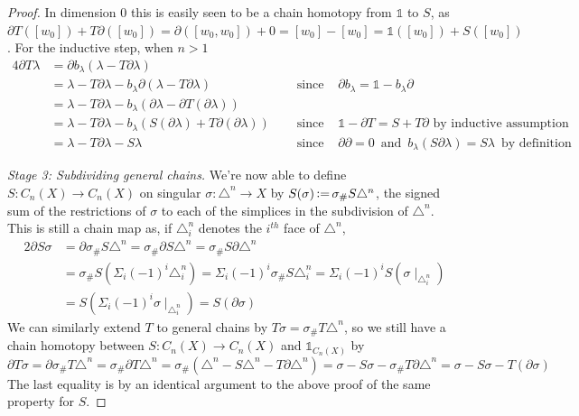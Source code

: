 \documentclass[11pt,a4paper,twoside]{article}
\theoremstyle{plain}
\theoremstyle{definition}
\theoremstyle{definition}
\theoremstyle{definition}
\theoremstyle{definition}
\theoremstyle{definition}
\DeclareMathOperator{\coloneqq}{\vcentcolon=}
\begin{document}
\begin{proof}
In dimension $0$ this is easily seen to be a chain homotopy from $\mathbb{1}$ to $S$, as $\partial T([w_0])+T\partial([w_0])=\partial([w_0,w_0])+0=[w_0]-[w_0]=\mathbb{1}([w_0])+S([w_0])$. For the inductive step, when $n>1$
\begin{alignat*}{4}
\partial T\lambda & = \partial b_\lambda(\lambda-T\partial\lambda)\\
&=\lambda-T\partial\lambda-b_\lambda\partial(\lambda-T\partial\lambda) \quad & \text{ since } & \partial b_\lambda=\mathbb{1}-b_\lambda\partial \\
&=\lambda-T\partial\lambda-b_\lambda(\partial\lambda-\partial T(\partial\lambda))\\
&=\lambda-T\partial\lambda-b_\lambda(S(\partial\lambda)+T\partial(\partial\lambda))\quad & \text{ since } & \mathbb{1}-\partial T=S+T\partial \text{ by inductive assumption }\\
&=\lambda-T\partial\lambda-S\lambda\quad & \text{ since } & \partial\partial=0\,\text{ and } \,b_\lambda(S\partial\lambda)=S\lambda\,\text{ by definition }
\end{alignat*}

\emph{Stage 3: Subdividing general chains.}
We're now able to define $S\!:\!C_n(X)\!\longrightarrow\!C_n(X)$ on singular $\sigma\!:\!\triangle^n\!\longrightarrow X$ by $S(\sigma)\coloneqq\sigma_\#S\triangle^n$, the signed sum of the restrictions of $\sigma$ to each of the simplices in the subdivision of $\triangle^n$. This is still a chain map as, if $\triangle_i^n$ denotes the $i^{th}$ face of $\triangle^n$,
\begin{alignat*}{2}
\partial S\sigma &= \partial\sigma_\#S\triangle^n=\sigma_\#\partial S\triangle^n=\sigma_\#S\partial\triangle^n \\
&= \sigma_\# S(\Sigma_i(-1)^i\triangle_i^n)=\Sigma_i(-1)^i\sigma_\#S\triangle_i^n=\Sigma_i(-1)^iS(\sigma\!\mid_{\triangle_i^n})\\
&=S(\Sigma_i(-1)^i\sigma\!\mid_{\triangle_i^n}) = S(\partial\sigma)
\end{alignat*}
We can similarly extend $T$ to general chains by $T\sigma=\sigma_\#T\triangle^n$, so we still have a chain homotopy between $S\!:\!C_n(X)\!\longrightarrow\!C_n(X)$ and $\mathbb{1}_{C_n(X)}$ by
$$\partial T\sigma\!=\!\partial\sigma_\# T\triangle^n\!=\!\sigma_\#\partial T\triangle^n\!=\!\sigma_\#(\triangle^n\!-\!S\triangle^n\!-\!T\partial\triangle^n)\!=\!\sigma\!-\!S\sigma\!-\!\sigma_\#T\partial\triangle^n\!=\!\sigma\!-\!S\sigma\!-\!T(\partial\sigma)$$
The last equality is by an identical argument to the above proof of the same property for $S$. 


\end{proof}
\end{document}
